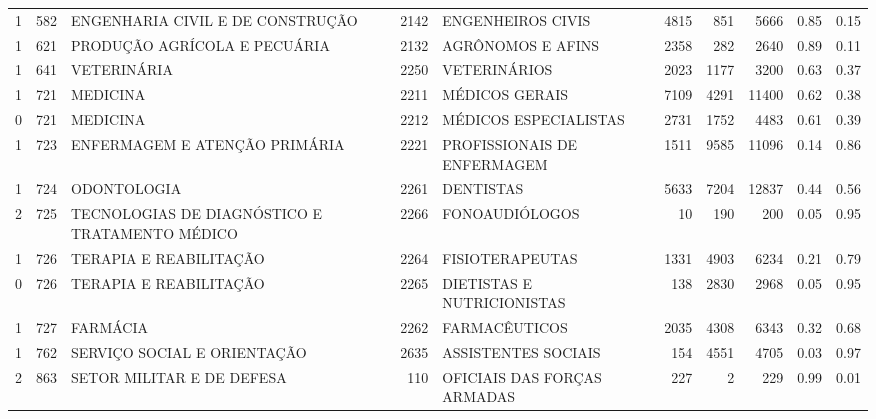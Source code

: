 \begin{table}
\begin{tabular}{rrlrlrrrrr}
       1 &    582 &                   ENGENHARIA CIVIL E DE CONSTRUÇÃO & 2142 &                                 ENGENHEIROS CIVIS  &  4815 &   851 &   5666 & 0.85 & 0.15 \\
       1 &    621 &                       PRODUÇÃO AGRÍCOLA E PECUÁRIA & 2132 &                                  AGRÔNOMOS E AFINS &  2358 &   282 &   2640 & 0.89 & 0.11 \\
       1 &    641 &                                        VETERINÁRIA & 2250 &                                       VETERINÁRIOS &  2023 &  1177 &   3200 & 0.63 & 0.37 \\
       1 &    721 &                                           MEDICINA & 2211 &                                     MÉDICOS GERAIS &  7109 &  4291 &  11400 & 0.62 & 0.38 \\
       0 &    721 &                                           MEDICINA & 2212 &                              MÉDICOS ESPECIALISTAS &  2731 &  1752 &   4483 & 0.61 & 0.39 \\
       1 &    723 &                      ENFERMAGEM E ATENÇÃO PRIMÁRIA & 2221 &                       PROFISSIONAIS DE ENFERMAGEM  &  1511 &  9585 &  11096 & 0.14 & 0.86 \\
       1 &    724 &                                        ODONTOLOGIA & 2261 &                                          DENTISTAS &  5633 &  7204 &  12837 & 0.44 & 0.56 \\
       2 &    725 &     TECNOLOGIAS DE DIAGNÓSTICO E TRATAMENTO MÉDICO & 2266 &                                     FONOAUDIÓLOGOS &    10 &   190 &    200 & 0.05 & 0.95 \\
       1 &    726 &                             TERAPIA E REABILITAÇÃO & 2264 &                                    FISIOTERAPEUTAS &  1331 &  4903 &   6234 & 0.21 & 0.79 \\
       0 &    726 &                             TERAPIA E REABILITAÇÃO & 2265 &                         DIETISTAS E NUTRICIONISTAS &   138 &  2830 &   2968 & 0.05 & 0.95 \\
       1 &    727 &                                           FARMÁCIA & 2262 &                                      FARMACÊUTICOS &  2035 &  4308 &   6343 & 0.32 & 0.68 \\
       1 &    762 &                        SERVIÇO SOCIAL E ORIENTAÇÃO & 2635 &                                ASSISTENTES SOCIAIS &   154 &  4551 &   4705 & 0.03 & 0.97 \\
       2 &    863 &                          SETOR MILITAR E DE DEFESA &  110 &                        OFICIAIS DAS FORÇAS ARMADAS &   227 &     2 &    229 & 0.99 & 0.01 \\
\bottomrule
\end{tabular}
\end{table}
